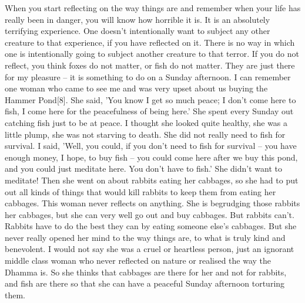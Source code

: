 When you start reflecting on the way things are and remember when your life has really been in danger, you will know how horrible it is. It is an absolutely terrifying experience. One doesn't intentionally want to subject any other creature to that experience, if you have reflected on it. There is no way in which one is intentionally going to subject another creature to that terror. If you do not reflect, you think foxes do not matter, or fish do not matter. They are just there for my pleasure -- it is something to do on a Sunday afternoon. I can remember one woman who came to see me and was very upset about us buying the Hammer Pond[8]. She said, 'You know I get so much peace; I don't come here to fish, I come here for the peacefulness of being here.' She spent every Sunday out catching fish just to be at peace. I thought she looked quite healthy, she was a little plump, she was not starving to death. She did not really need to fish for survival. I said, 'Well, you could, if you don't need to fish for survival -- you have enough money, I hope, to buy fish -- you could come here after we buy this pond, and you could just meditate here. You don't have to fish.' She didn't want to meditate! Then she went on about rabbits eating her cabbages, so she had to put out all kinds of things that would kill rabbits to keep them from eating her cabbages. This woman never reflects on anything. She is begrudging those rabbits her cabbages, but she can very well go out and buy cabbages. But rabbits can't. Rabbits have to do the best they can by eating someone else's cabbages. But she never really opened her mind to the way things are, to what is truly kind and benevolent. I would not say she was a cruel or heartless person, just an ignorant middle class woman who never reflected on nature or realised the way the Dhamma is. So she thinks that cabbages are there for her and not for rabbits, and fish are there so that she can have a peaceful Sunday afternoon torturing them.

